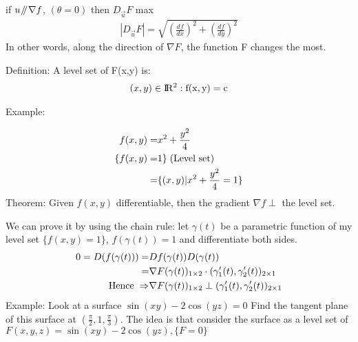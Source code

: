 \documentclass{article}
\newcommand{\R}{\rm I\!R}
\newcommand{\parallelsum}{\mathbin{\!/\mkern-5mu/\!}}
\begin{document}
        if $u\parallelsum\nabla f$, $(\theta = 0)$ then $D_{\vec{u}}F$ max
        \begin{align}
            |D_{\vec{u}}F| = \sqrt{(\frac{df}{dx})^2+(\frac{df}{dy})^2}
        \end{align}
        In other words, along the direction of $\nabla F$, the function F changes the most.
        
        Definition: A level set of F(x,y) is:
        \begin{align}
            (x,y)\in\R^2:f(x,y) = c
        \end{align}
        
        Example:
        \begin{wrapfigure}[12]{l}{0.5\textwidth}
            \begin{center}
            \end{center}
        \end{wrapfigure}
        \begin{align}
            f(x,y) =& x^2 + \frac{y^2}{4}\\
            \{f(x,y) =& 1\}\text{\;(Level set)}\\
            =& \{(x,y)|x^2 + \frac{y^2}{4} = 1\}
        \end{align}
        Theorem: Given $f(x,y)$ differentiable, then the gradient $\nabla f\perp$ the level set.
        
        We can prove it by using the chain rule: let $\gamma(t)$ be a parametric function of my level set $\{f(x,y) = 1\}$, $f(\gamma(t))=1$ and differentiate both sides.
        \begin{align}
            0 = D(f(\gamma(t))) =& Df(\gamma(t)) D(\gamma(t))\\
            =& \nabla F(\gamma(t))_{1\times2} \cdot (\gamma_1'(t),\gamma_2'(t))_{2\times1}\\
            \text{Hence\;}\Rightarrow& \nabla F(\gamma(t))_{1\times2} \perp (\gamma_1'(t),\gamma_2'(t))_{2\times1}
        \end{align}
        Example: Look at a surface $\sin(xy)-2\cos(yz)=0$ Find the tangent plane of this surface at $(\frac{\pi}{2},1,\frac{\pi}{3})$. The idea is that consider the surface as a level set of $F(x,y,z) = \sin(xy)-2\cos(yz),\{F=0\}$
        
\end{document}
